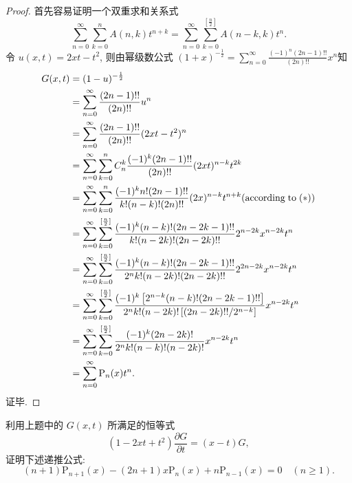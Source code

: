 \begin{proof} 
  首先容易证明一个双重求和关系式
  \begin{equation}
    \sum_{n=0}^{\infty}\sum_{k=0}^nA(n,k)t^{n+k}
    = \sum_{n=0}^{\infty}\sum_{k=0}^{[\frac{n}{2}]}A(n-k,k)t^n. \tag{$\star$}
  \end{equation}
  令 $u(x,t)=2xt-t^2$, 则由幂级数公式 
  $(1+x)^{-\frac{1}{2}}=\sum_{n=0}^{\infty}\frac{(-1)^n(2n-1)!!}{(2n)!!}x^n$知
  \[\begin{split}
    G(x,t)
    & =(1-u)^{-\frac{1}{2}}\\
    & =\sum_{n=0}^{\infty}\frac{(2n-1)!!}{(2n)!!}u^n\\
    & =\sum_{n=0}^{\infty}\frac{(2n-1)!!}{(2n)!!}(2xt-t^2)^n\\
    & =\sum_{n=0}^{\infty}\sum_{k=0}^nC_n^k\frac{(-1)^k(2n-1)!!}{(2n)!!}(2xt)^{n-k}t^{2k}\\
    & =\sum_{n=0}^{\infty}\sum_{k=0}^n\frac{(-1)^kn!(2n-1)!!}{k!(n-k)!(2n)!!}(2x)^{n-k}t^{n+k}(\textrm{according\;to}\;(*))\\
    & =\sum_{n=0}^{\infty}\sum_{k=0}^{[\frac{n}{2}]}\frac{(-1)^k(n-k)!(2n-2k-1)!!}{k!(n-2k)!(2n-2k)!!}2^{n-2k}x^{n-2k}t^n\\
    & =\sum_{n=0}^{\infty}\sum_{k=0}^{[\frac{n}{2}]}\frac{(-1)^k(n-k)!(2n-2k-1)!!}{2^nk!(n-2k)!(2n-2k)!!}2^{2n-2k}x^{n-2k}t^n\\
    & =\sum_{n=0}^{\infty}\sum_{k=0}^{[\frac{n}{2}]}\frac{(-1)^k\left[2^{n-k}(n-k)!(2n-2k-1)!!\right]}{2^nk!(n-2k)!\left[(2n-2k)!!/2^{n-k}\right]}x^{n-2k}t^n\\
    & =\sum_{n=0}^{\infty}\sum_{k=0}^{[\frac{n}{2}]}\frac{(-1)^k(2n-2k)!}{2^nk!(n-k)!(n-2k)!}x^{n-2k}t^n\\
    & =\sum_{n=0}^{\infty}\mathrm{P}_n(x)t^n.
  \end{split}\]
  证毕.
\end{proof}



\begin{exercise}
  利用上题中的 $G(x,t)$ 所满足的恒等式
  \[(1-2xt+t^2)\frac{\partial G}{\partial t}=(x-t)G,\]
  证明下述递推公式:
  \[(n+1)\mathrm{P}_{n+1}(x)-(2n+1)x\mathrm{P}_n(x)+n\mathrm{P}_{n-1}(x)=0\quad (n\geq 1).\]
\end{exercise}

